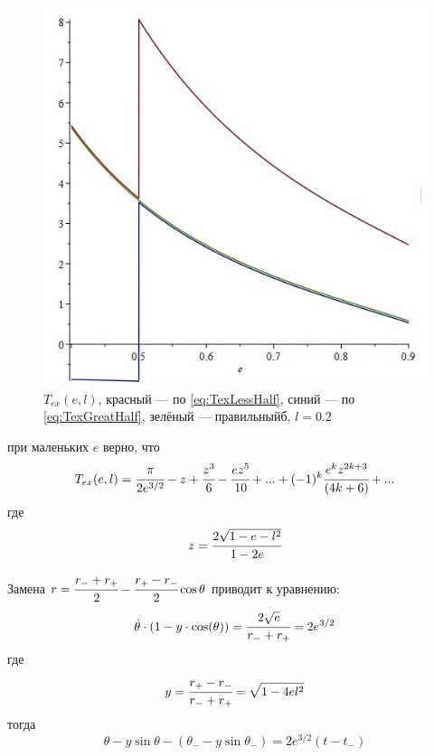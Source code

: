 \begin{enumerate}
\begin{itemize}
			
			\begin{figure}[!h]
				\begin{center}
					\includegraphics[scale=0.5]{imags/graphT.jpg}
				\end{center}
				\caption{$T_{ex}(e,l)$, красный --- по \ref{eq:TexLessHalf}, синий --- по \ref{eq:TexGreatHalf}, зелёный --- правильныйб, $l=0.2$}
				\label{graph:Tex}
			\end{figure}
			
			при маленьких $e$ верно, что
			\begin{equation}
				T_{ex}(e,l) = \cfrac{\pi}{2e^{3/2}} - 
				z + \cfrac{z^3}{6}-\cfrac{ez^5}{10} +...+ (-1)^k\cfrac{e^{k}z^{2k+3}}{(4k+6)}
				+...
			\end{equation}
			где
			\begin{equation}
				z = \cfrac{2\sqrt{1-e-l^2}}{1-2e}
			\end{equation}
			
			Замена $r = \cfrac{r_{-}+r_{+}}{2} - \cfrac{r_{+}-r_{-}}{2} \cos{\theta}$ приводит к уравнению:
			\begin{equation*}
				\dot{\theta}\cdot(1 - y\cdot\cos(\theta)) = \cfrac{2\sqrt{e}}{r_{-}+r_{+}} = 2e^{3/2}
			\end{equation*}
				где 
			\begin{equation*}
				y = \cfrac{r_{+}-r_{-}}{r_{-}+r_{+}} = \sqrt{1 - 4el^2}
			\end{equation*}
			тогда 
			\begin{equation*}
				\theta - y \sin{\theta} - (\theta_{-} - y\sin{\theta_{-}}) = 2e^{3/2}(t-t_{-})
			\end{equation*}
			

\end{itemize}
\end{enumerate}
